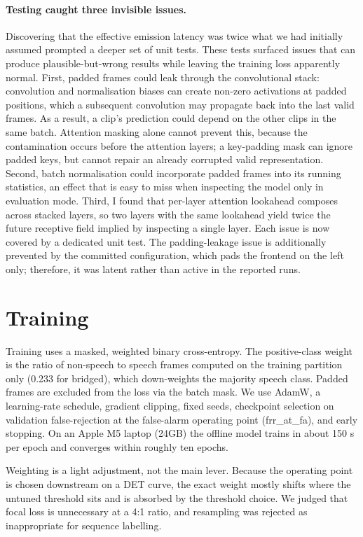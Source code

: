 \documentclass{article}
\begin{document}
\paragraph{Testing caught three invisible issues.}
Discovering that the effective emission latency was twice what we had initially assumed prompted a deeper set of unit tests. These tests surfaced issues that can produce plausible-but-wrong results while leaving the training loss apparently normal. First, padded frames could leak through the convolutional stack: convolution and normalisation biases can create non-zero activations at padded positions, which a subsequent convolution may propagate back into the last valid frames. As a result, a clip's prediction could depend on the other clips in the same batch. Attention masking alone cannot prevent this, because the contamination occurs before the attention layers; a key-padding mask can ignore padded keys, but cannot repair an already corrupted valid representation. Second, batch normalisation could incorporate padded frames into its running statistics, an effect that is easy to miss when inspecting the model only in evaluation mode. Third, I found that per-layer attention lookahead composes across stacked layers, so two layers with the same lookahead yield twice the future receptive field implied by inspecting a single layer. Each issue is now covered by a dedicated unit test. The padding-leakage issue is additionally prevented by the committed configuration, which pads the frontend on the left only; therefore, it was latent rather than active in the reported runs.


\section{Training}
\label{sec:train}

Training uses a masked, weighted binary cross-entropy. The positive-class weight is the ratio of non-speech to speech frames computed on the training partition only (0.233 for bridged), which down-weights the majority speech class. Padded frames are excluded from the loss via the batch mask. We use AdamW, a learning-rate schedule, gradient clipping, fixed seeds, checkpoint selection on validation false-rejection at the false-alarm operating point (frr\_at\_fa), and early stopping. On an Apple M5 laptop (24GB) the offline model trains in about 150 s per epoch and converges within roughly ten epochs.

Weighting is a light adjustment, not the main lever. Because the operating point is chosen downstream on a DET curve, the exact weight mostly shifts where the untuned threshold sits and is absorbed by the threshold choice. We judged that focal loss is unnecessary at a 4:1 ratio, and resampling was rejected as
inappropriate for sequence labelling.
\end{document}
